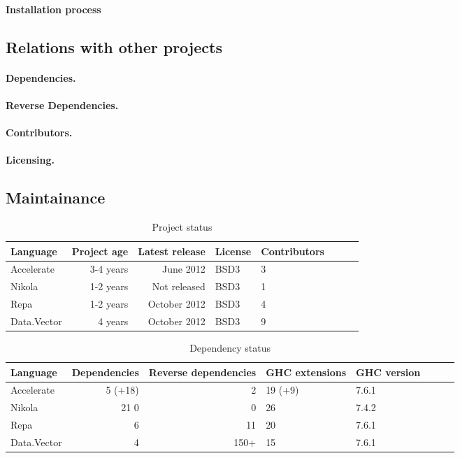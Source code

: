 \paragraph{Installation process}

\subsection{Relations with other projects}
\paragraph{Dependencies.}
\paragraph{Reverse Dependencies.}
\paragraph{Contributors.}
\paragraph{Licensing.}
\subsection{Maintainance}


\begin{table}
  \centering
  \begin{tabular}{l|rrllllr}
    Language    & Project age & Latest release & License & Contributors \\ \hline
    Accelerate  & 3-4 years   & June 2012      & BSD3    & 3 \\
    Nikola      & 1-2 years   & Not released   & BSD3    & 1 \\
    Repa        & 1-2 years   & October 2012   & BSD3    & 4 \\
    Data.Vector & 4 years     & October 2012   & BSD3    & 9 \\
  \end{tabular}
  \caption{Project status}
  \label{tab:project_status}
\end{table}

\begin{table}
  \centering
  \begin{tabular}{l|rrllllr}
    Language    & Dependencies & Reverse dependencies & GHC extensions & GHC version \\ \hline
    Accelerate  & 5 (+18)      & 2                    & 19 (+9)        & 7.6.1 \\
    Nikola      & 21 0         & 0                    & 26             & 7.4.2 \\
    Repa        & 6            & 11                   & 20             & 7.6.1 \\
    Data.Vector & 4            & 150+                 & 15             & 7.6.1 \\
  \end{tabular}
  \caption{Dependency status}
  \label{tab:dependency_status}
\end{table}


